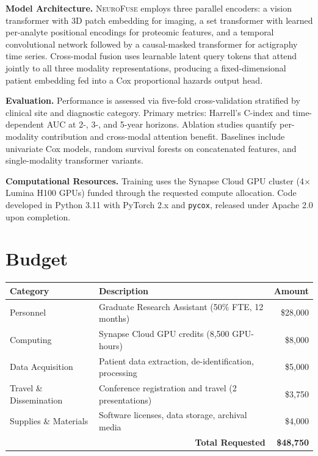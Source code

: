 \documentclass[10pt]{article}
\begin{document}
\textbf{Model Architecture.} \textsc{NeuroFuse} employs three parallel encoders: a vision transformer with 3D patch embedding for imaging, a set transformer with learned per-analyte positional encodings for proteomic features, and a temporal convolutional network followed by a causal-masked transformer for actigraphy time series. Cross-modal fusion uses learnable latent query tokens that attend jointly to all three modality representations, producing a fixed-dimensional patient embedding fed into a Cox proportional hazards output head.

\textbf{Evaluation.} Performance is assessed via five-fold cross-validation stratified by clinical site and diagnostic category. Primary metrics: Harrell's C-index and time-dependent AUC at 2-, 3-, and 5-year horizons. Ablation studies quantify per-modality contribution and cross-modal attention benefit. Baselines include univariate Cox models, random survival forests on concatenated features, and single-modality transformer variants.

\textbf{Computational Resources.} Training uses the Synapse Cloud GPU cluster (4$\times$ Lumina H100 GPUs) funded through the requested compute allocation. Code developed in Python 3.11 with PyTorch 2.x and \texttt{pycox}, released under Apache 2.0 upon completion.

\section{Budget}

\begin{tabularx}{\textwidth}{@{} l >{\raggedright\arraybackslash}X r @{}}
  \toprule
  \textbf{Category} & \textbf{Description} & \textbf{Amount} \\
  \midrule
  Personnel & Graduate Research Assistant (50\% FTE, 12 months) & \$28,000 \\
  Computing & Synapse Cloud GPU credits (8,500 GPU-hours) & \$8,000 \\
  Data Acquisition & Patient data extraction, de-identification, processing & \$5,000 \\
  Travel \& Dissemination & Conference registration and travel (2 presentations) & \$3,750 \\
  Supplies \& Materials & Software licenses, data storage, archival media & \$4,000 \\
  \midrule
  \multicolumn{2}{r}{\textbf{Total Requested}} & \textbf{\$48,750} \\
  \bottomrule
\end{tabularx}
\end{document}
